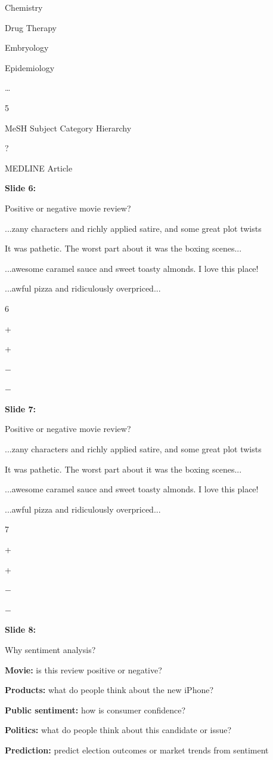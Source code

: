 \documentclass[11pt,a4paper]{article}
\begin{document}
Chemistry

Drug Therapy

Embryology

Epidemiology

…

5

MeSH Subject Category Hierarchy

?

MEDLINE Article

\textbf{Slide 6:}

Positive or negative movie review?

...zany characters and richly applied satire, and some great plot twists

It was pathetic. The worst part about it was the boxing scenes...

...awesome caramel sauce and sweet toasty almonds. I love this place!

...awful pizza and ridiculously overpriced...

6

+

+

−

−

\textbf{Slide 7:}

Positive or negative movie review?

...zany characters and richly applied satire, and some great plot twists

It was pathetic. The worst part about it was the boxing scenes...

...awesome caramel sauce and sweet toasty almonds. I love this place!

...awful pizza and ridiculously overpriced...

7

+

+

−

−

\textbf{Slide 8:}

Why sentiment analysis?

\textbf{Movie:}   is this review positive or negative?

\textbf{Products:}  what do people think about the new iPhone?

\textbf{Public sentiment:}  how is consumer confidence?

\textbf{Politics:}  what do people think about this candidate or issue?

\textbf{Prediction:}  predict election outcomes or market trends from sentiment
\end{document}

